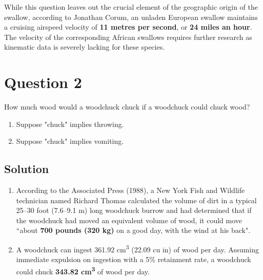 \documentclass[
  UTF8, %
  12pt, %
]{assignment}
\begin{document}
While this question leaves out the crucial element of the geographic origin of the swallow, according to Jonathan Corum, an unladen European swallow maintains a cruising airspeed velocity of \textbf{11 metres per second}, or \textbf{24 miles an hour}. The velocity of the corresponding African swallows requires further research as kinematic data is severely lacking for these species.


\section*{Question 2}

\begin{problem}
How much wood would a woodchuck chuck if a woodchuck could chuck wood?

\medskip

\begin{enumerate}[label=(\emph{\alph*}), ref=\alph*] %
  \item Suppose "chuck" implies throwing.
  \item Suppose "chuck" implies vomiting.
\end{enumerate}
\end{problem}


\subsection*{Solution}

\begin{enumerate}[label=(\emph{\alph*}), ref=\alph*] %
  \item According to the Associated Press (1988), a New York Fish and Wildlife technician named Richard Thomas calculated the volume of dirt in a typical 25--30 foot (7.6--9.1 m) long woodchuck burrow and had determined that if the woodchuck had moved an equivalent volume of wood, it could move ``about \textbf{700 pounds (320 kg)} on a good day, with the wind at his back".

  \item A woodchuck can ingest 361.92 cm\textsuperscript{3} (22.09 cu in) of wood per day. Assuming immediate expulsion on ingestion with a 5\% retainment rate, a woodchuck could chuck \textbf{343.82 cm\textsuperscript{3}} of wood per day.
\end{enumerate}
\end{document}
